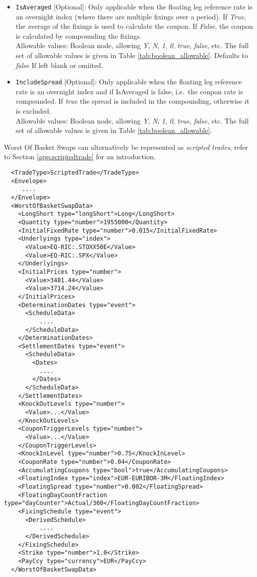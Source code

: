 \begin{itemize}
  \item \lstinline!IsAveraged! [Optional]: Only applicable when the floating leg
  reference rate is an overnight index (where there are multiple fixings over a period). If \emph{True},
  the average of the fixings is used to calculate the coupon. If \emph{False},
  the coupon is calculated by compounding the fixings. \\
    Allowable values: Boolean node, allowing \emph{Y}, \emph{N}, \emph{1}, \emph{0}, \emph{true},
    \emph{false}, etc. The full set of allowable values is given in Table \ref{tab:boolean_allowable}.
    Defaults to \emph{false} If left blank or omiited.
  \item \lstinline!IncludeSpread! [Optional]: Only applicable when the floating leg
  reference rate is an overnight index and if IsAveraged is false, i.e.\ the coupon rate is compounded.
  If \emph{true} the spread is included in the compounding, otherwise it is excluded. \\
     Allowable values:  Boolean node, allowing \emph{Y}, \emph{N}, \emph{1}, \emph{0}, \emph{true}, \emph{false}, etc.
  The full set of allowable values is given in Table \ref{tab:boolean_allowable}.
\end{itemize}

Worst Of Basket Swaps can alternatively be represented as {\em scripted trades}, refer to Section \ref{app:scriptedtrade} for an introduction.

\begin{verbatim}
  <TradeType>ScriptedTrade</TradeType>
  <Envelope>
     ....
  </Envelope>
  <WorstOfBasketSwapData>
    <LongShort type="longShort">Long</LongShort>
    <Quantity type="number">1955000</Quantity>
    <InitialFixedRate type="number">0.015</InitialFixedRate>
    <Underlyings type="index">
      <Value>EQ-RIC:.STOXX50E</Value>
      <Value>EQ-RIC:.SPX</Value>
    </Underlyings>
    <InitialPrices type="number">
      <Value>3481.44</Value>
      <Value>3714.24</Value>
    </InitialPrices>
    <DeterminationDates type="event">
      <ScheduleData>
          ....
      </ScheduleData>
    </DeterminationDates>
    <SettlementDates type="event">
      <ScheduleData>
        <Dates>
          ....
        </Dates>
      </ScheduleData>
    </SettlementDates>
    <KnockOutLevels type="number">
      <Value>...</Value>
    </KnockOutLevels>
    <CouponTriggerLevels type="number">
      <Value>...</Value>
    </CouponTriggerLevels>
    <KnockInLevel type="number">0.75</KnockInLevel>
    <CouponRate type="number">0.04</CouponRate>
    <AccumulatingCoupons type="bool">true</AccumulatingCoupons>
    <FloatingIndex type="index">EUR-EURIBOR-3M</FloatingIndex>
    <FloatingSpread type="number">0.002</FloatingSpread>
    <FloatingDayCountFraction type="dayCounter">Actual/360</FloatingDayCountFraction>
    <FixingSchedule type="event">
      <DerivedSchedule>
          ....
      </DerivedSchedule>
    </FixingSchedule>
    <Strike type="number">1.0</Strike>
    <PayCcy type="currency">EUR</PayCcy>
  </WorstOfBasketSwapData>
\end{verbatim}

